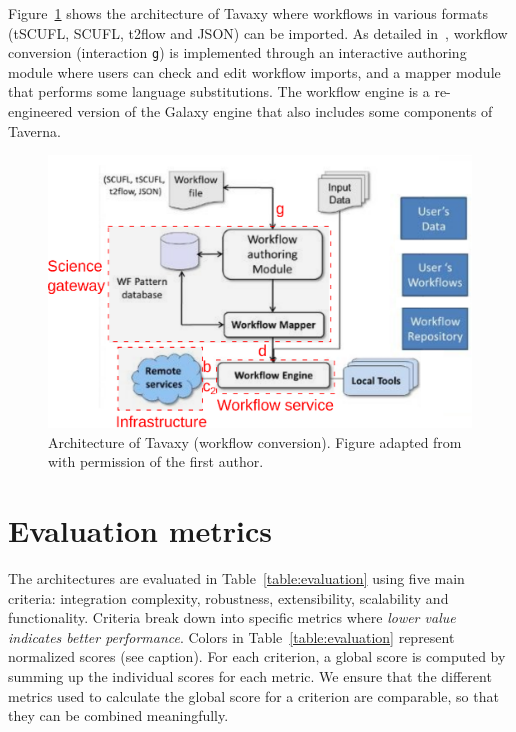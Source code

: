 \documentclass[preprint,3p,twocolumn]{elsarticle}
\newcommand{\correction}[1]{\color{blue}#1\color{black}\xspace}
\begin{document}
{Figure~\ref{fig:tavaxy} shows the architecture of Tavaxy where
workflows in various formats (tSCUFL, SCUFL, t2flow and JSON) can be
imported. As detailed in~\cite{Abouelhoda2012}, workflow conversion
(interaction \texttt{g}) is implemented through an interactive
authoring module where users can check and edit workflow imports, and
a mapper module that performs some language substitutions. The
workflow engine is a re-engineered version of the Galaxy engine that
also includes some components of Taverna.
\begin{figure}
\centering
\includegraphics[width=\columnwidth]{figures/Tavaxy.eps}
\caption{\correction{Architecture of Tavaxy (workflow conversion). Figure adapted
  from~\cite{Abouelhoda2012} with permission of the first author}.}
\label{fig:tavaxy}
\end{figure}

}

\section{\correction{Evaluation metrics}}

\label{sec:metrics}

The architectures are
evaluated in Table~\ref{table:evaluation} using five main criteria:
integration complexity, robustness, extensibility, scalability and
\correction{functionality}. Criteria break down into
specific metrics where \emph{lower value indicates better
  performance}. Colors in Table~\ref{table:evaluation} represent
normalized scores (see caption). For each criterion, a global score is
computed by summing up the individual scores for each metric. We
ensure that the different metrics used to calculate the global score
for a criterion are comparable, so that they can be combined
meaningfully.
\end{document}
